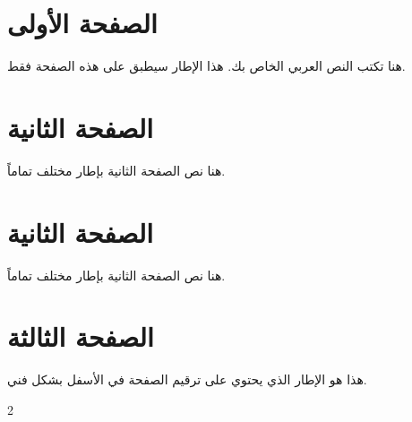 \documentclass[12pt,a4paper]{article}
\begin{document}
\activateBGdefault
\section*{الصفحة الأولى}
هنا تكتب النص العربي الخاص بك. هذا الإطار سيطبق على هذه الصفحة فقط.
\newpage
\ClearShipoutPicture
\activateBGone
\section*{الصفحة الثانية}
هنا نص الصفحة الثانية بإطار مختلف تماماً.
\newpage
\ClearShipoutPicture
\activateBGtwo
\section*{الصفحة الثانية}
هنا نص الصفحة الثانية بإطار مختلف تماماً.

\newpage
\ClearShipoutPicture
\activateBGfour
\section*{الصفحة الثالثة}
هذا هو الإطار الذي يحتوي على ترقيم الصفحة في الأسفل بشكل فني.
\newpage
\ClearShipoutPicture       %
\activateBGthree           %

\begin{multicols*}{2}
\lipsum[1-4]
\end{multicols*}
\end{document}
